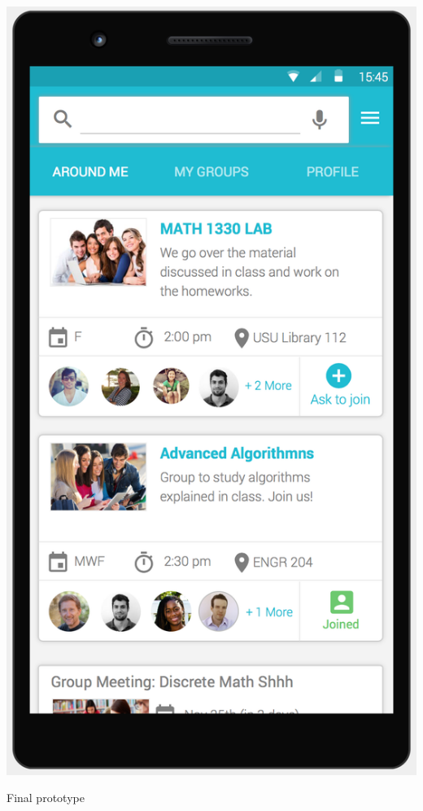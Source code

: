 \documentclass{sigchi-ext}
\begin{document}
\begin{marginfigure}[23pt]
  \begin{minipage}{\marginparwidth}
    \centering
	  \includegraphics[width=0.7\marginparwidth]{figures/beta_prototype.png}
    \caption{Final prototype}
  \end{minipage}
\end{marginfigure}
\end{document}
